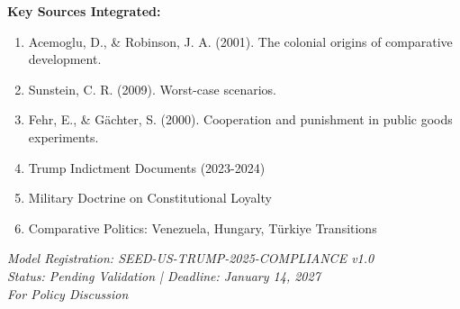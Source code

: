 \documentclass[11pt]{article}
\begin{document}
\nocite{bcm_master}

\textbf{Key Sources Integrated:}
\begin{enumerate}
\item Acemoglu, D., \& Robinson, J. A. (2001). The colonial origins of comparative development.
\item Sunstein, C. R. (2009). Worst-case scenarios.
\item Fehr, E., \& Gächter, S. (2000). Cooperation and punishment in public goods experiments.
\item Trump Indictment Documents (2023-2024)
\item Military Doctrine on Constitutional Loyalty
\item Comparative Politics: Venezuela, Hungary, Türkiye Transitions
\end{enumerate}

\vspace{2cm}

\begin{center}
\textit{Model Registration: SEED-US-TRUMP-2025-COMPLIANCE v1.0} \\
\textit{Status: Pending Validation | Deadline: January 14, 2027} \\
\textit{For Policy Discussion}
\end{center}
\end{document}
